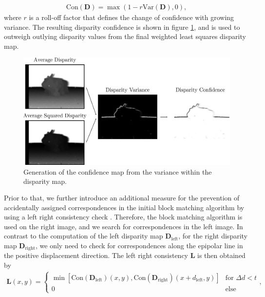 \begin{align}
	\text{Con}(\bm{D}) = \max\left(1-r\text{Var}(\bm{D}),0\right),
\end{align}
where $r$ is a roll-off factor that defines the change of confidence with growing variance. The resulting disparity confidence is shown in figure \ref{fig::324_confidence_map}, and is used to outweigh outlying disparity values from the final weighted least squares disparity map. 
\begin{figure}[h]
	\centering
	\includegraphics[scale=.28]{chapters/03_background/img/confidence_map.png}
	\caption{Generation of the confidence map from the variance within the disparity map.}
	\label{fig::324_confidence_map}
\end{figure}
Prior to that, we further introduce an additional measure for the prevention of accidentally assigned correspondences in the initial block matching algorithm by using a left right consistency check \cite{egnal2004stereo}. Therefore, the block matching algorithm is used on the right image, and we search for correspondences in the left image. In contrast to the computation of the left disparity map $\bm{D}_\text{left}$, for the right disparity map $\bm{D}_\text{right}$, we only need to check for correspondences along the epipolar line in the positive displacement direction. The left right consistency $\bm{L}$ is then obtained by 
\begin{align}
	\bm{L}(x, y) = 
	\begin{cases}
	\min \left[\text{Con}(\bm{D}_\text{left})(x, y), \text{Con}(\bm{D}_\text{right})(x + d_\text{left}, y)\right] & \text{for } \Delta d < t  \\
	0 & \text{else}
	\end{cases},
\end{align}

